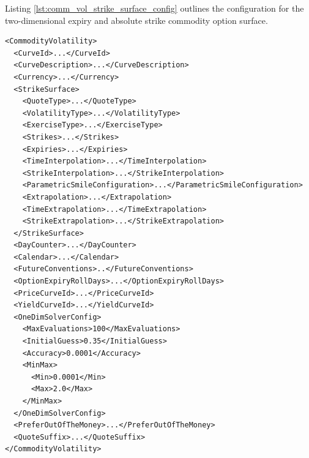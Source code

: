 Listing \ref{lst:comm_vol_strike_surface_config} outlines the configuration for the two-dimensional expiry and absolute strike commodity option surface.

\begin{longlisting}
\begin{verbatim}
<CommodityVolatility>
  <CurveId>...</CurveId>
  <CurveDescription>...</CurveDescription>
  <Currency>...</Currency>
  <StrikeSurface>
    <QuoteType>...</QuoteType>
    <VolatilityType>...</VolatilityType>
    <ExerciseType>...</ExerciseType>
    <Strikes>...</Strikes>
    <Expiries>...</Expiries>
    <TimeInterpolation>...</TimeInterpolation>
    <StrikeInterpolation>...</StrikeInterpolation>
    <ParametricSmileConfiguration>...</ParametricSmileConfiguration>
    <Extrapolation>...</Extrapolation>
    <TimeExtrapolation>...</TimeExtrapolation>
    <StrikeExtrapolation>...</StrikeExtrapolation>
  </StrikeSurface>
  <DayCounter>...</DayCounter>
  <Calendar>...</Calendar>
  <FutureConventions>..</FutureConventions>
  <OptionExpiryRollDays>...</OptionExpiryRollDays>
  <PriceCurveId>...</PriceCurveId>
  <YieldCurveId>...</YieldCurveId>
  <OneDimSolverConfig>
    <MaxEvaluations>100</MaxEvaluations>
    <InitialGuess>0.35</InitialGuess>
    <Accuracy>0.0001</Accuracy>
    <MinMax>
      <Min>0.0001</Min>
      <Max>2.0</Max>
    </MinMax>
  </OneDimSolverConfig>
  <PreferOutOfTheMoney>...</PreferOutOfTheMoney>
  <QuoteSuffix>...</QuoteSuffix>
</CommodityVolatility>
\end{verbatim}
\caption{Expiry and absolute strike commodity option surface configuration}
\label{lst:comm_vol_strike_surface_config}
\end{longlisting}

